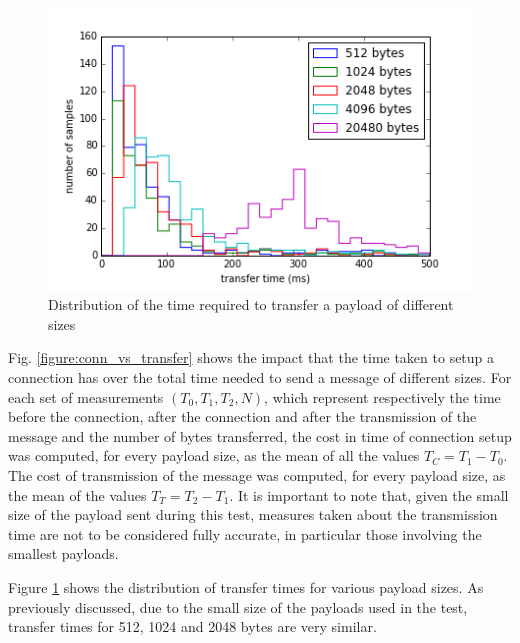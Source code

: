 \begin{figure}[ht!]
  \centering
  \includegraphics[width=1.0\textwidth]{application/img/transfer-time-distribution.png}
  \caption{Distribution of the time required to transfer a payload of different sizes}
  \label{figure:transfer_time_distribution}
\end{figure}

Fig. \ref{figure:conn_vs_transfer} shows the impact that the time taken to setup a connection has over the total time needed to send a message of different sizes.
For each set of measurements $(T_0, T_1, T_2, N)$, which represent respectively the time before the connection, after the connection and after the transmission of the message and the number of bytes transferred, the cost in time of connection setup was computed, for every payload size, as the mean of all the values $T_C = T_1 - T_0$.
The cost of transmission of the message was computed, for every payload size, as the mean of the values $T_T = T_2 - T_1$.
It is important to note that, given the small size of the payload sent during this test, measures taken about the transmission time are not to be considered fully accurate, in particular those involving the smallest payloads.

Figure \ref{figure:transfer_time_distribution} shows the distribution of transfer times for various payload sizes.
As previously discussed, due to the small size of the payloads used in the test, transfer times for 512, 1024 and 2048 bytes are very similar.


